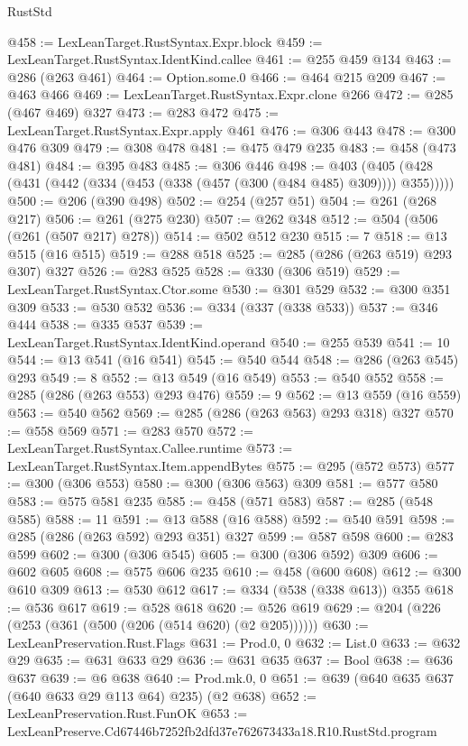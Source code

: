 \begin{lexlean}{RustStd}
\begin{coremodule}
@458 := LexLeanTarget.RustSyntax.Expr.block
@459 := LexLeanTarget.RustSyntax.IdentKind.callee
@461 := @255 @459 @134
@463 := @286 (@263 @461)
@464 := Option.some.{0}
@466 := @464 @215 @209
@467 := @463 @466
@469 := LexLeanTarget.RustSyntax.Expr.clone @266
@472 := @285 (@467 @469) @327
@473 := @283 @472
@475 := LexLeanTarget.RustSyntax.Expr.apply @461
@476 := @306 @443
@478 := @300 @476 @309
@479 := @308 @478
@481 := @475 @479 @235
@483 := @458 (@473 @481)
@484 := @395 @483
@485 := @306 @446
@498 := @403 (@405 (@428 (@431 (@442 (@334 (@453 (@338 (@457 (@300 (@484 @485) @309)))) @355)))))
@500 := @206 (@390 @498)
@502 := @254 (@257 @51)
@504 := @261 (@268 @217)
@506 := @261 (@275 @230)
@507 := @262 @348
@512 := @504 (@506 (@261 (@507 @217) @278))
@514 := @502 @512 @230
@515 := 7
@518 := @13 @515 (@16 @515)
@519 := @288 @518
@525 := @285 (@286 (@263 @519) @293 @307) @327
@526 := @283 @525
@528 := @330 (@306 @519)
@529 := LexLeanTarget.RustSyntax.Ctor.some
@530 := @301 @529
@532 := @300 @351 @309
@533 := @530 @532
@536 := @334 (@337 (@338 @533))
@537 := @346 @444
@538 := @335 @537
@539 := LexLeanTarget.RustSyntax.IdentKind.operand
@540 := @255 @539
@541 := 10
@544 := @13 @541 (@16 @541)
@545 := @540 @544
@548 := @286 (@263 @545) @293
@549 := 8
@552 := @13 @549 (@16 @549)
@553 := @540 @552
@558 := @285 (@286 (@263 @553) @293 @476)
@559 := 9
@562 := @13 @559 (@16 @559)
@563 := @540 @562
@569 := @285 (@286 (@263 @563) @293 @318) @327
@570 := @558 @569
@571 := @283 @570
@572 := LexLeanTarget.RustSyntax.Callee.runtime
@573 := LexLeanTarget.RustSyntax.Item.appendBytes
@575 := @295 (@572 @573)
@577 := @300 (@306 @553)
@580 := @300 (@306 @563) @309
@581 := @577 @580
@583 := @575 @581 @235
@585 := @458 (@571 @583)
@587 := @285 (@548 @585)
@588 := 11
@591 := @13 @588 (@16 @588)
@592 := @540 @591
@598 := @285 (@286 (@263 @592) @293 @351) @327
@599 := @587 @598
@600 := @283 @599
@602 := @300 (@306 @545)
@605 := @300 (@306 @592) @309
@606 := @602 @605
@608 := @575 @606 @235
@610 := @458 (@600 @608)
@612 := @300 @610 @309
@613 := @530 @612
@617 := @334 (@538 (@338 @613)) @355
@618 := @536 @617
@619 := @528 @618
@620 := @526 @619
@629 := @204 (@226 (@253 (@361 (@500 (@206 (@514 @620) (@2 @205))))))
@630 := LexLeanPreservation.Rust.Flags
@631 := Prod.{0, 0}
@632 := List.{0}
@633 := @632 @29
@635 := @631 @633 @29
@636 := @631 @635
@637 := Bool
@638 := @636 @637
@639 := @6 @638
@640 := Prod.mk.{0, 0}
@651 := @639 (@640 @635 @637 (@640 @633 @29 @113 @64) @235) (@2 @638)
@652 := LexLeanPreservation.Rust.FunOK
@653 := LexLeanPreserve.Cd67446b7252fb2dfd37e762673433a18.R10.RustStd.program

\end{coremodule}
\end{lexlean}
